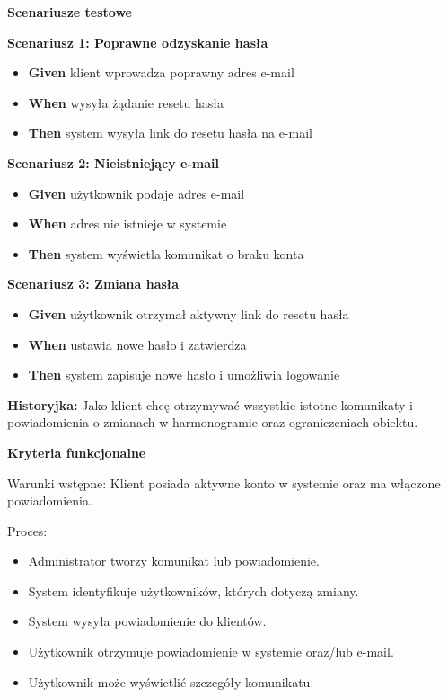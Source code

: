 \documentclass[a4paper,12pt]{article}
\begin{document}
\noindent \textbf{Scenariusze testowe}

\textbf{Scenariusz 1: Poprawne odzyskanie hasła}
\begin{itemize}
    \item \textbf{Given} klient wprowadza poprawny adres e-mail
    \item \textbf{When} wysyła żądanie resetu hasła
    \item \textbf{Then} system wysyła link do resetu hasła na e-mail
\end{itemize}

\textbf{Scenariusz 2: Nieistniejący e-mail}
\begin{itemize}
    \item \textbf{Given} użytkownik podaje adres e-mail
    \item \textbf{When} adres nie istnieje w systemie
    \item \textbf{Then} system wyświetla komunikat o braku konta
\end{itemize}

\textbf{Scenariusz 3: Zmiana hasła}
\begin{itemize}
    \item \textbf{Given} użytkownik otrzymał aktywny link do resetu hasła
    \item \textbf{When} ustawia nowe hasło i zatwierdza
    \item \textbf{Then} system zapisuje nowe hasło i umożliwia logowanie
\end{itemize}

\vspace{0,5cm}

\noindent \textbf{Historyjka:} Jako klient chcę otrzymywać wszystkie istotne komunikaty i powiadomienia o zmianach w harmonogramie oraz ograniczeniach obiektu.

\vspace{0,2cm}

\noindent \textbf{Kryteria funkcjonalne}

\vspace{0,2cm}

\noindent Warunki wstępne: Klient posiada aktywne konto w systemie oraz ma włączone powiadomienia.

\vspace{0,2cm}

\noindent Proces:

\begin{itemize}
    \item Administrator tworzy komunikat lub powiadomienie.
    \item System identyfikuje użytkowników, których dotyczą zmiany.
    \item System wysyła powiadomienie do klientów.
    \item Użytkownik otrzymuje powiadomienie w systemie oraz/lub e-mail.
    \item Użytkownik może wyświetlić szczegóły komunikatu.
\end{itemize}
\end{document}
